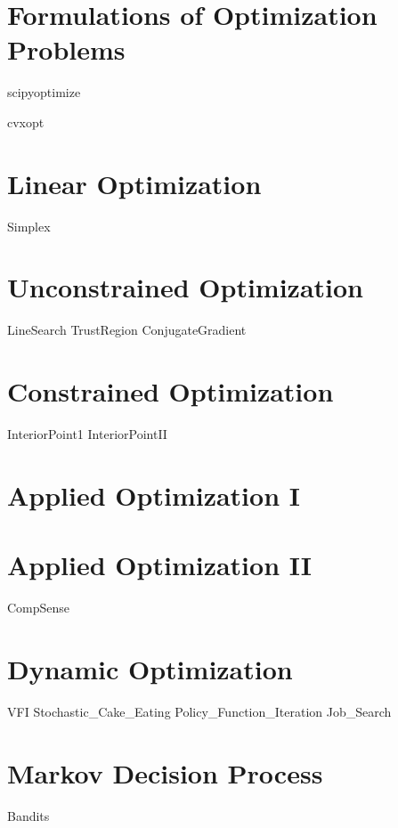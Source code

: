 \documentclass[nociteref]{SIAM-GH-book}
\begin{document}
\part{Formulations of Optimization Problems}
{scipyoptimize}

{cvxopt}

\part{Linear Optimization}
{Simplex}


\part{Unconstrained Optimization}
{LineSearch}
{TrustRegion}
{ConjugateGradient}

\part{Constrained Optimization}
{InteriorPoint1}
{InteriorPointII}

\part{Applied Optimization I}

\part{Applied Optimization II}
{CompSense}

\part{Dynamic Optimization}
{VFI}
{Stochastic_Cake_Eating}
{Policy_Function_Iteration}
{Job_Search}

\part{Markov Decision Process}
{Bandits}
\end{document}
